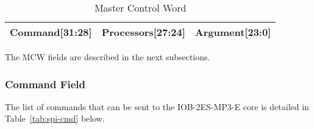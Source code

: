 \documentclass{ug}
\theoremstyle{plain}
\begin{document}
\begin{table}[H]
  \begin{center}
    \begin{tabular}{|l|l|l|}
      \hline
      \hline
      \rowcolor{iob-green}
      \textbf{Command[31:28]} & \textbf{Processors[27:24]}  & \textbf{Argument[23:0]} \\
      \hline
      \hline
    \end{tabular}
    \caption{Master Control Word}
    \label{tab:spi-ctr}
  \end{center}
\end{table}

The MCW fields are described in the next subsections.

\clearpage 

\subsubsection{Command Field}

The list of commands that can be sent to the IOB-2ES-MP3-E core is
detailed in Table~\ref{tab:spi-cmd} below.
\end{document}
